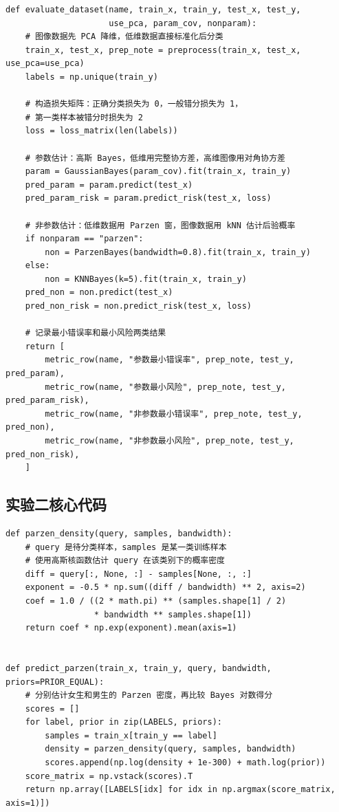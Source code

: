 \documentclass[UTF8,a4paper,12pt]{ctexart}
\begin{document}
\begin{lstlisting}[caption={Exp.1 extension unified Bayes evaluation},label={lst:exp1-extended-eval}]
def evaluate_dataset(name, train_x, train_y, test_x, test_y,
                     use_pca, param_cov, nonparam):
    # 图像数据先 PCA 降维，低维数据直接标准化后分类
    train_x, test_x, prep_note = preprocess(train_x, test_x, use_pca=use_pca)
    labels = np.unique(train_y)

    # 构造损失矩阵：正确分类损失为 0，一般错分损失为 1，
    # 第一类样本被错分时损失为 2
    loss = loss_matrix(len(labels))

    # 参数估计：高斯 Bayes，低维用完整协方差，高维图像用对角协方差
    param = GaussianBayes(param_cov).fit(train_x, train_y)
    pred_param = param.predict(test_x)
    pred_param_risk = param.predict_risk(test_x, loss)

    # 非参数估计：低维数据用 Parzen 窗，图像数据用 kNN 估计后验概率
    if nonparam == "parzen":
        non = ParzenBayes(bandwidth=0.8).fit(train_x, train_y)
    else:
        non = KNNBayes(k=5).fit(train_x, train_y)
    pred_non = non.predict(test_x)
    pred_non_risk = non.predict_risk(test_x, loss)

    # 记录最小错误率和最小风险两类结果
    return [
        metric_row(name, "参数最小错误率", prep_note, test_y, pred_param),
        metric_row(name, "参数最小风险", prep_note, test_y, pred_param_risk),
        metric_row(name, "非参数最小错误率", prep_note, test_y, pred_non),
        metric_row(name, "非参数最小风险", prep_note, test_y, pred_non_risk),
    ]
\end{lstlisting}

\subsection{实验二核心代码}

\begin{lstlisting}[caption={Exp.2 Parzen density estimation},label={lst:exp2-parzen}]
def parzen_density(query, samples, bandwidth):
    # query 是待分类样本，samples 是某一类训练样本
    # 使用高斯核函数估计 query 在该类别下的概率密度
    diff = query[:, None, :] - samples[None, :, :]
    exponent = -0.5 * np.sum((diff / bandwidth) ** 2, axis=2)
    coef = 1.0 / ((2 * math.pi) ** (samples.shape[1] / 2)
                  * bandwidth ** samples.shape[1])
    return coef * np.exp(exponent).mean(axis=1)


def predict_parzen(train_x, train_y, query, bandwidth, priors=PRIOR_EQUAL):
    # 分别估计女生和男生的 Parzen 密度，再比较 Bayes 对数得分
    scores = []
    for label, prior in zip(LABELS, priors):
        samples = train_x[train_y == label]
        density = parzen_density(query, samples, bandwidth)
        scores.append(np.log(density + 1e-300) + math.log(prior))
    score_matrix = np.vstack(scores).T
    return np.array([LABELS[idx] for idx in np.argmax(score_matrix, axis=1)])
\end{lstlisting}
\end{document}
